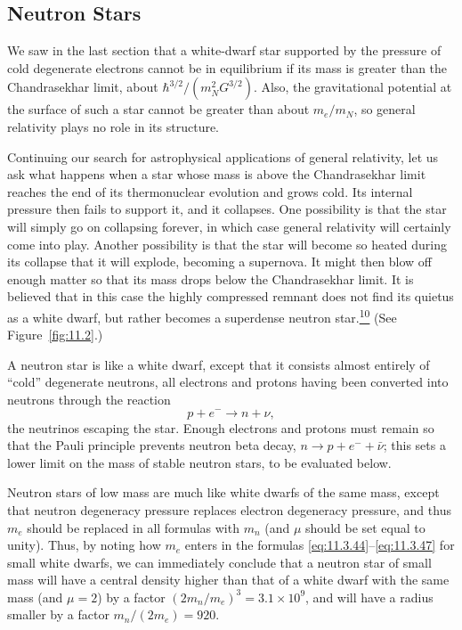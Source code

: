 
\subsection{Neutron Stars}\label{sec:11.4}

We saw in the last section that a white-dwarf star supported by the pressure
of cold degenerate electrons cannot be in equilibrium if its mass is greater
than the Chandrasekhar limit, about
\(\hbar^{3/2}/(m_N^2G^{3/2})\). Also, the gravitational potential at the
surface of such a star cannot be greater than about \(m_e/m_N\), so general
relativity plays no role in its structure.

Continuing our search for astrophysical applications of general relativity,
let us ask what happens when a star whose mass is above the Chandrasekhar limit
reaches the end of its thermonuclear evolution and grows cold. Its internal
pressure then fails to support it, and it collapses. One possibility is that
the star will simply go on collapsing forever, in which case general relativity
will certainly come into play. Another possibility is that the star will
become so heated during its collapse that it will explode, becoming a
supernova. It might then blow off enough matter so that its mass drops below
the Chandrasekhar limit. It is believed that in this case the highly compressed
remnant does not find its quietus as a white dwarf, but rather becomes a
superdense neutron star.\hyperref[ch11-ref-10]{\textsuperscript{10}}
(See Figure~\ref{fig:11.2}.)



A neutron star is like a white dwarf, except that it consists almost entirely
of ``cold'' degenerate neutrons, all electrons and protons having been
converted into neutrons through the reaction
\[
  p+e^-\longrightarrow n+\nu,
\]
the neutrinos escaping the star. Enough electrons and protons must remain so
that the Pauli principle prevents neutron beta decay,
\(n\to p+e^-+\bar\nu\); this sets a lower limit on the mass of stable neutron
stars, to be evaluated below.

Neutron stars of low mass are much like white dwarfs of the same mass, except
that neutron degeneracy pressure replaces electron degeneracy pressure, and
thus \(m_e\) should be replaced in all formulas with \(m_n\) (and \(\mu\)
should be set equal to unity). Thus, by noting how \(m_e\) enters in the
formulas \eqref{eq:11.3.44}--\eqref{eq:11.3.47} for small white dwarfs, we
can immediately conclude that a neutron star of small mass will have a central
density higher than that of a white dwarf with the same mass (and \(\mu=2\))
by a factor \((2m_n/m_e)^3=3.1\times10^9\), and will have a radius smaller by
a factor \(m_n/(2m_e)=920\).

